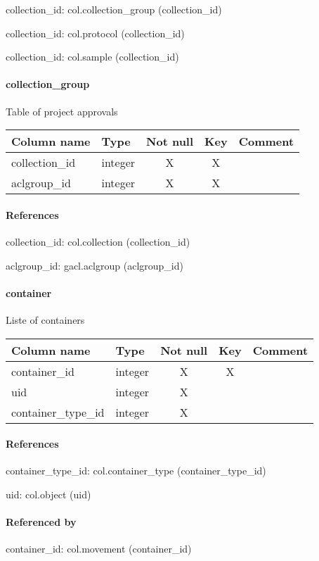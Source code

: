collection\_id: col.collection\_group (collection\_id)

collection\_id: col.protocol (collection\_id)

collection\_id: col.sample (collection\_id)

\paragraph{collection\_group}
Table of project approvals

\begin{tabular}{|l| p{2cm}|c|c| p{5cm}|}
\hline
Column name & Type & Not null & Key & Comment \\
\hline
collection\_id & integer & X & X & \\
aclgroup\_id & integer & X & X & \\
\hline
\end{tabular}
\paragraph{References}
collection\_id: col.collection (collection\_id)

aclgroup\_id: gacl.aclgroup (aclgroup\_id)

\paragraph{container}
Liste of containers

\begin{tabular}{|l| p{2cm}|c|c| p{5cm}|}
\hline
Column name & Type & Not null & Key & Comment \\
\hline
container\_id & integer & X & X & \\
uid & integer & X &  & \\
container\_type\_id & integer & X &  & \\
\hline
\end{tabular}
\paragraph{References}
container\_type\_id: col.container\_type (container\_type\_id)

uid: col.object (uid)

\paragraph{Referenced by}
container\_id: col.movement (container\_id)

